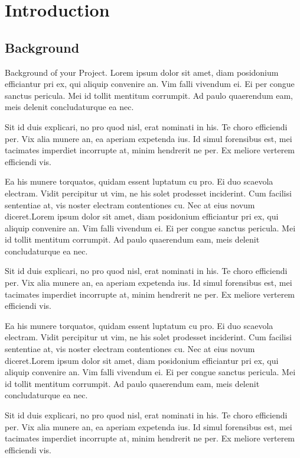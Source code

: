 

\newpage
{} %

\chapter{Introduction}
\section{Background}\label{sec:bkgrnd}%
Background of your Project. Lorem ipsum dolor sit  amet, diam posidonium efficiantur pri ex, qui aliquip convenire an. Vim falli vivendum ei. Ei per congue sanctus pericula. Mei id tollit mentitum corrumpit. Ad paulo quaerendum eam, meis delenit concludaturque ea nec.\par
Sit id duis explicari, no pro quod nisl, erat nominati in his. Te choro efficiendi per. Vix alia munere an, ea aperiam expetenda ius. Id simul forensibus est, mei tacimates imperdiet incorrupte at, minim hendrerit ne per. Ex meliore verterem efficiendi vis.

Ea his munere torquatos, quidam essent luptatum cu pro. Ei duo scaevola electram. Vidit percipitur ut vim, ne his solet prodesset inciderint. Cum facilisi sententiae at, vis noster electram contentiones cu. Nec at eius novum diceret.Lorem ipsum dolor sit  amet, diam posidonium efficiantur pri ex, qui aliquip convenire an. Vim falli vivendum ei. Ei per congue sanctus pericula. Mei id tollit mentitum corrumpit. Ad paulo quaerendum eam, meis delenit concludaturque ea nec.\par
Sit id duis explicari, no pro quod nisl, erat nominati in his. Te choro efficiendi per. Vix alia munere an, ea aperiam expetenda ius. Id simul forensibus est, mei tacimates imperdiet incorrupte at, minim hendrerit ne per. Ex meliore verterem efficiendi vis.

Ea his munere torquatos, quidam essent luptatum cu pro. Ei duo scaevola electram. Vidit percipitur ut vim, ne his solet prodesset inciderint. Cum facilisi sententiae at, vis noster electram contentiones cu. Nec at eius novum diceret.Lorem ipsum dolor sit  amet, diam posidonium efficiantur pri ex, qui aliquip convenire an. Vim falli vivendum ei. Ei per congue sanctus pericula. Mei id tollit mentitum corrumpit. Ad paulo quaerendum eam, meis delenit concludaturque ea nec.\par
Sit id duis explicari, no pro quod nisl, erat nominati in his. Te choro efficiendi per. Vix alia munere an, ea aperiam expetenda ius. Id simul forensibus est, mei tacimates imperdiet incorrupte at, minim hendrerit ne per. Ex meliore verterem efficiendi vis.

